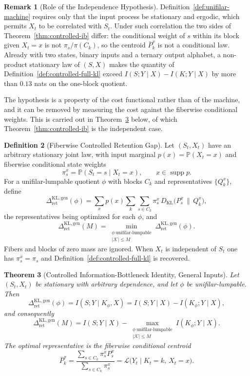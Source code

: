 \documentclass[12pt]{article}
\newtheorem{theorem}{Theorem}[section]
\theoremstyle{definition}
\newtheorem{definition}[theorem]{Definition}
\newtheorem{remark}[theorem]{Remark}
\DeclareMathOperator{\supp}{supp}
\newcommand{\RetKLg}{\Delta_{\mathrm{ret}}^{\mathrm{KL,gen}}}
\begin{document}
\begin{remark}[Role of the Independence Hypothesis]
\label{rem:controlled-ib-independence}
Definition~\ref{def:unifilar-machine} requires only that the input process be
stationary and ergodic, which permits $X_t$ to be correlated with $S_t$.  Under
such correlation the two sides of Theorem~\ref{thm:controlled-ib} differ: the
conditional weight of $s$ within its block given $X_t=x$ is not
$\pi_s/\pi(C_k)$, so the centroid $\bar P_k^x$ is not a conditional law.
Already with two states, binary inputs and a ternary output alphabet, a
non-product stationary law of $(S,X)$ makes the quantity of
Definition~\ref{def:controlled-full-kl} exceed $I(S;Y\mid X)-I(K;Y\mid X)$ by
more than $0.13$ nats on the one-block quotient.

The hypothesis is a property of the cost functional rather than of the
machine, and it can be removed by measuring the cost against the fiberwise
conditional weights.  This is carried out in
Theorem~\ref{thm:controlled-ib-general} below, of which
Theorem~\ref{thm:controlled-ib} is the independent case.
\end{remark}

\begin{definition}[Fiberwise Controlled Retention Gap]
\label{def:controlled-full-kl-general}
Let $(S_t,X_t)$ have an arbitrary stationary joint law, with input marginal
$p(x)=\mathbb P(X_t=x)$ and fiberwise conditional state weights
\[
\pi_s^x=\mathbb P(S_t=s\mid X_t=x),
\qquad
x\in\supp p .
\]
For a unifilar-lumpable quotient $\phi$ with blocks $C_k$ and representatives
$\{Q_k^x\}$, define
\[
\RetKLg(\phi)
=
\sum_xp(x)\sum_k\sum_{s\in C_k}\pi_s^x\,
D_{\mathrm{KL}}\bigl(P_s^x\,\big\|\,Q_k^x\bigr),
\]
the representatives being optimized for each $\phi$, and
\[
\RetKLg(M)
=
\min_{\substack{\phi\ \text{unifilar-lumpable}\\|\mathcal K|\le M}}
\RetKLg(\phi).
\]
Fibers and blocks of zero mass are ignored.  When $X_t$ is independent of
$S_t$ one has $\pi_s^x=\pi_s$ and
Definition~\ref{def:controlled-full-kl} is recovered.
\end{definition}

\begin{theorem}[Controlled Information-Bottleneck Identity, General Inputs]
\label{thm:controlled-ib-general}
Let $(S_t,X_t)$ be stationary with arbitrary dependence, and let $\phi$ be
unifilar-lumpable.  Then
\[
\RetKLg(\phi)
=
I(S;Y\mid K_\phi,X)
=
I(S;Y\mid X)-I(K_\phi;Y\mid X),
\]
and consequently
\[
\RetKLg(M)
=
I(S;Y\mid X)
-
\max_{\substack{\phi\ \text{unifilar-lumpable}\\|\mathcal K|\le M}}
I(K_\phi;Y\mid X).
\]
The optimal representative is the fiberwise conditional centroid
\[
\bar P_k^x
=
\frac{\sum_{s\in C_k}\pi_s^xP_s^x}{\sum_{s\in C_k}\pi_s^x}
=
\mathcal L\bigl(Y_t\mid K_t=k,\ X_t=x\bigr).
\]
\end{theorem}
\end{document}
